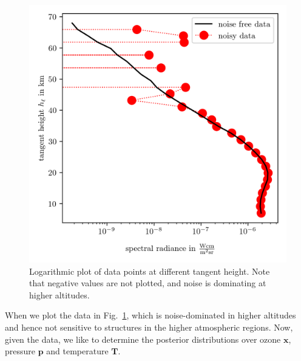 \begin{figure}[th!]
	\centering
	\includegraphics{DataPlot.png}
	\caption[Logarithmic plot of data points at different tangent height.]{Logarithmic plot of data points at different tangent height. Note that negative values are not plotted, and noise is dominating at higher altitudes.}
	\label{fig:DataPlot}
\end{figure}
When we plot the data in Fig.~\ref{fig:DataPlot}, which is noise-dominated in higher altitudes and hence not sensitive to structures in the higher atmospheric regions.
Now, given the data, we like to determine the posterior distributions over ozone $\bm{x}$, pressure $\bm{p}$ and temperature $\bm{T}$.
\clearpage


